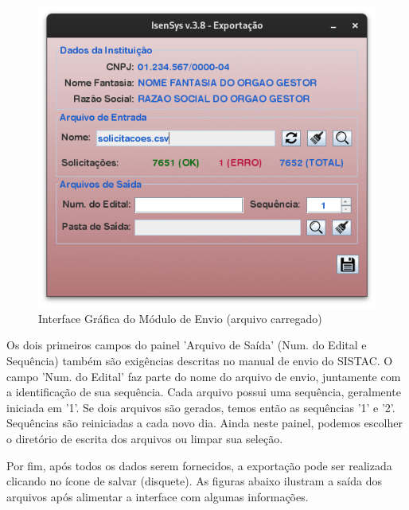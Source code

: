 \documentclass[
	12pt,			%
	openright,		%
	oneside,	
	a4paper,		%
	english,		%
	brazil			%
]{abntex2/abntex2}  %
\begin{document}
	\begin{figure}[H]
		\begin{center}
			
			\caption{Interface Gráfica do Módulo de Envio (arquivo carregado)}
			\label{envio-ui-loaded}
			
			\includegraphics[scale=0.5]{img/envio-ui-loaded}
			
		\end{center}
	\end{figure}
	
	Os dois primeiros campos do painel 'Arquivo de Saída' (Num. do Edital e Sequência) também são exigências descritas no manual de envio do SISTAC. O campo 'Num. do Edital' faz parte do nome do arquivo de envio, juntamente com a identificação de sua sequência. Cada arquivo possui uma sequência, geralmente iniciada em '1'. Se dois arquivos são gerados, temos então as sequências '1' e '2'. Sequências são reiniciadas a cada novo dia. Ainda neste painel, podemos escolher o diretório de escrita dos arquivos ou limpar sua seleção.

	Por fim, após todos os dados serem fornecidos, a exportação pode ser realizada clicando no ícone de salvar (disquete). As figuras abaixo ilustram a saída dos arquivos após alimentar a interface com algumas informações.
\end{document}
